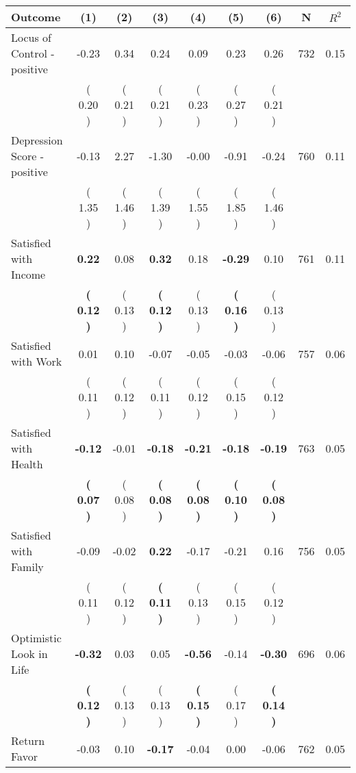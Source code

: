 \begin{tabular}{lcccccccc}
\toprule
 \textbf{Outcome} & \textbf{(1)} & \textbf{(2)} & \textbf{(3)} & \textbf{(4)} & \textbf{(5)} & \textbf{(6)} & \textbf{N} & \textbf{$ R^2$} \\
\midrule
Locus of Control - positive &     -0.23 &      0.34 &      0.24 &      0.09 &      0.23 &      0.26 & 732 &       0.15 \\ 
 & (     0.20 ) & (     0.21 ) & (     0.21 ) & (     0.23 ) & (     0.27 ) & (     0.21 ) & \\
Depression Score - positive &     -0.13 &      2.27 &     -1.30 &     -0.00 &     -0.91 &     -0.24 & 760 &       0.11 \\ 
 & (     1.35 ) & (     1.46 ) & (     1.39 ) & (     1.55 ) & (     1.85 ) & (     1.46 ) & \\
Satisfied with Income & \textbf{     0.22} &      0.08 & \textbf{     0.32} &      0.18 & \textbf{    -0.29} &      0.10 & 761 &       0.11 \\ 
 & \textbf{(     0.12 )} & (     0.13 ) & \textbf{(     0.12 )} & (     0.13 ) & \textbf{(     0.16 )} & (     0.13 ) & \\
Satisfied with Work &      0.01 &      0.10 &     -0.07 &     -0.05 &     -0.03 &     -0.06 & 757 &       0.06 \\ 
 & (     0.11 ) & (     0.12 ) & (     0.11 ) & (     0.12 ) & (     0.15 ) & (     0.12 ) & \\
Satisfied with Health & \textbf{    -0.12} &     -0.01 & \textbf{    -0.18} & \textbf{    -0.21} & \textbf{    -0.18} & \textbf{    -0.19} & 763 &       0.05 \\ 
 & \textbf{(     0.07 )} & (     0.08 ) & \textbf{(     0.08 )} & \textbf{(     0.08 )} & \textbf{(     0.10 )} & \textbf{(     0.08 )} & \\
Satisfied with Family &     -0.09 &     -0.02 & \textbf{     0.22} &     -0.17 &     -0.21 &      0.16 & 756 &       0.05 \\ 
 & (     0.11 ) & (     0.12 ) & \textbf{(     0.11 )} & (     0.13 ) & (     0.15 ) & (     0.12 ) & \\
Optimistic Look in Life & \textbf{    -0.32} &      0.03 &      0.05 & \textbf{    -0.56} &     -0.14 & \textbf{    -0.30} & 696 &       0.06 \\ 
 & \textbf{(     0.12 )} & (     0.13 ) & (     0.13 ) & \textbf{(     0.15 )} & (     0.17 ) & \textbf{(     0.14 )} & \\
Return Favor &     -0.03 &      0.10 & \textbf{    -0.17} &     -0.04 &      0.00 &     -0.06 & 762 &       0.05 \\ 

\end{tabular}
